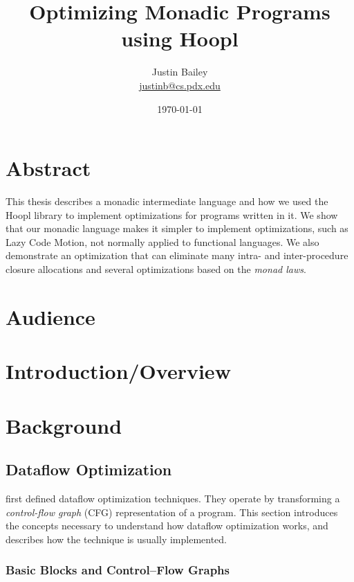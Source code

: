 \documentclass[11pt]{article}
\title{Optimizing Monadic Programs using Hoopl}
\author{Justin Bailey \\ \url{justinb@cs.pdx.edu}}
\date{\today}
\begin{document}
\VerbatimFootnotes
\DefineShortVerb{\#}
\doublespacing

\maketitle

\section{Abstract}

This thesis describes a monadic intermediate language and how we used
the Hoopl library to implement optimizations for programs written in
it. We show that our monadic language makes it simpler to implement
optimizations, such as Lazy Code Motion, not normally applied to
functional languages. We also demonstrate an optimization that can
eliminate many intra- and inter-procedure closure allocations and
several optimizations based on the \emph{monad laws}.

\section{Audience}

\section{Introduction/Overview}

\section{Background}
\subsection{Dataflow Optimization}

\citet{SoAndSo} first defined dataflow
optimization techniques. They operate by transforming a
\emph{control-flow graph} (CFG) representation of a program. This
section introduces the concepts necessary to understand how dataflow
optimization works, and describes how the technique is usually
implemented.


\subsubsection{Basic Blocks and Control--Flow Graphs}
\end{document}
